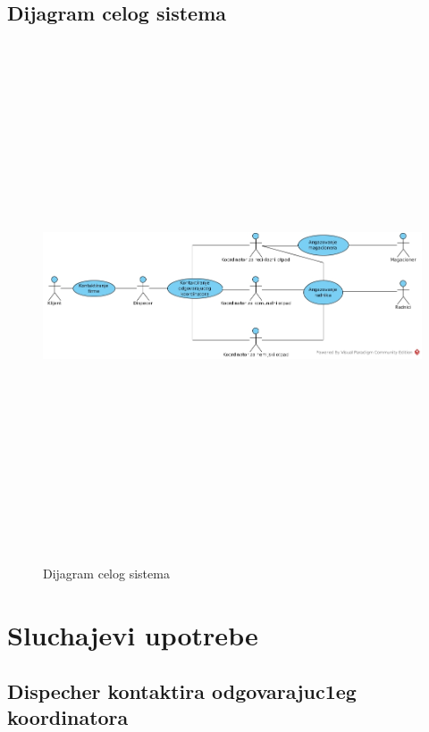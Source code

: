 \documentclass[10 pt]{article}
\begin{document}
\subsection{Dijagram celog sistema}
\begin{center}
	\begin{figure}[H]
		\includegraphics[width=15cm,height=15cm,keepaspectratio]{slike/DijagramCelogSistema}\\
		\caption{Dijagram celog sistema \label{overflow}}
	\end{figure}
\end{center}

\section{Sluchajevi upotrebe}


\subsection{Dispecher kontaktira odgovarajuc1eg koordinatora}
\end{document}
